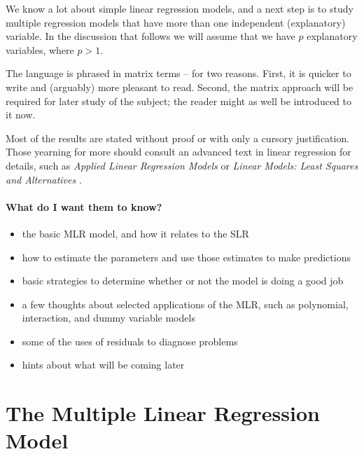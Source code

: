 \documentclass[captions=tableheading]{scrbook}
\begin{document}
\label{cha:multiple-linear-regression}

\noindent We know a lot about simple linear regression models, and a next step is to study multiple regression models that have more than one independent (explanatory) variable. In the discussion that follows we will assume that we have \(p\) explanatory variables, where \(p>1\).

The language is phrased in matrix terms -- for two reasons. First, it is quicker to write and (arguably) more pleasant to read. Second, the matrix approach will be required for later study of the subject; the reader might as well be introduced to it now.

Most of the results are stated without proof or with only a cursory justification. Those yearning for more should consult an advanced text in linear regression for details, such as \emph{Applied Linear Regression Models} \cite{Neter1996} or \emph{Linear Models: Least Squares and Alternatives} \cite{Rao1999}.


\paragraph*{What do I want them to know?}

\begin{itemize}
\item the basic MLR model, and how it relates to the SLR
\item how to estimate the parameters and use those estimates to make predictions
\item basic strategies to determine whether or not the model is doing a good job
\item a few thoughts about selected applications of the MLR, such as polynomial, interaction, and dummy variable models
\item some of the uses of residuals to diagnose problems
\item hints about what will be coming later
\end{itemize}
\section{The Multiple Linear Regression Model}
\label{sec-12-1}

\label{sec:The-MLR-Model}
\end{document}
